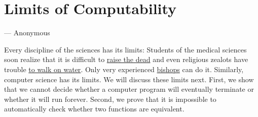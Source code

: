 \chapter{Limits of Computability}
\epigraph{}{
— \calligfont Anonymous}

Every discipline of the sciences has its limits: Students of the medical sciences soon realize that
it is difficult to \href{http://www.wowhead.com/spell=61999}{raise the dead} and even religious zealots
have trouble \href{http://www.youtube.com/watch?v=RUMX_b_m3Js}{to walk on water}.
Only very experienced \href{https://youtu.be/3gLwE44yieY}{bishops} can do it.
Similarly, computer science has its limits.  We will discuss 
these limits next.
First, we show that we cannot decide whether a computer program will eventually
terminate or whether it will run forever.
Second, we prove that it is impossible to automatically check whether two functions are equivalent.


